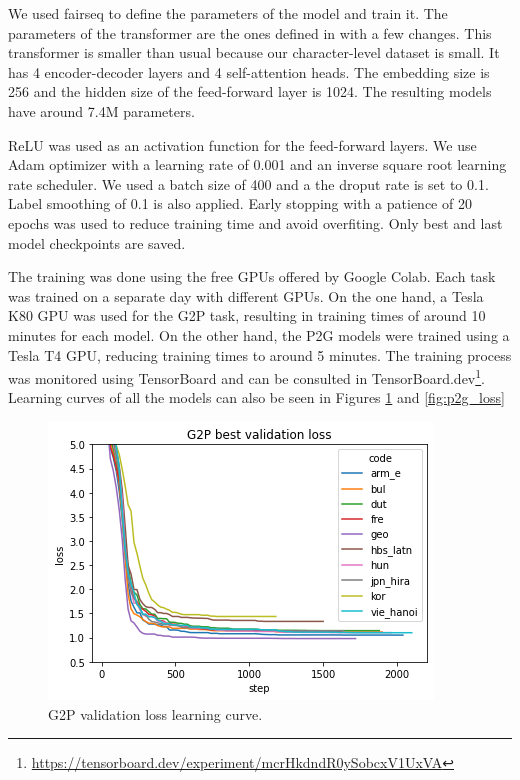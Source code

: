 \documentclass[11pt,a4paper]{article}
\begin{document}
We used fairseq to define the parameters of the model and train it. The parameters of the transformer are the ones defined in \citet{wu2021applying} with a few changes. This transformer is smaller than usual because our character-level dataset is small. It has 4 encoder-decoder layers and 4 self-attention heads. The embedding size is 256 and the hidden size of the feed-forward layer is 1024. The resulting models have around 7.4M parameters.

ReLU was used as an activation function for the feed-forward layers. We use Adam optimizer with a learning rate of 0.001 and an inverse square root learning rate scheduler. We used a batch size of 400 and a the droput rate is set to 0.1. Label smoothing of 0.1 is also applied. Early stopping with a patience of 20 epochs was used to reduce training time and avoid overfiting. Only best and last model checkpoints are saved.

The training was done using the free GPUs offered by Google Colab. Each task was trained on a separate day with different GPUs. On the one hand, a Tesla K80 GPU was used for the G2P task, resulting in training times of around 10 minutes for each model. On the other hand, the P2G models were trained using a Tesla T4 GPU, reducing training times to around 5 minutes. The training process was monitored using TensorBoard and can be consulted in TensorBoard.dev\footnote{\url{https://tensorboard.dev/experiment/mcrHkdndR0ySobcxV1UxVA}}. Learning curves of all the models can also be seen in Figures \ref{fig:g2p_loss} and \ref{fig:p2g_loss}

\begin{figure}[ht]
    \centering
    \includegraphics[width=\linewidth]{g2p_loss.png}
    \caption{G2P validation loss learning curve.}
    \label{fig:g2p_loss}
\end{figure}
\end{document}

